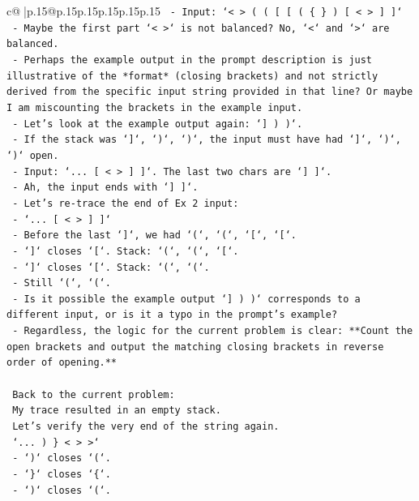 \documentclass{article}
\begin{document}
{\begin{supertabular}{c@{$\;$}|p{.15\linewidth}@{}p{.15\linewidth}p{.15\linewidth}p{.15\linewidth}p{.15\linewidth}p{.15\linewidth}}
{{{\texttt{   {-} Input: `< > ( ( {[} {[} ( \{ \} ) {[} < > {]} {]}`} \\
\texttt{   {-} Maybe the first part `< >` is not balanced? No, `<` and `>` are balanced.} \\
\texttt{   {-} Perhaps the example output in the prompt description is just illustrative of the *format* (closing brackets) and not strictly derived from the specific input string provided in that line? Or maybe I am miscounting the brackets in the example input.} \\
\texttt{   {-} Let's look at the example output again: `{]} ) )`.} \\
\texttt{   {-} If the stack was `{]}`, `)`, `)`, the input must have had `{]}`, `)`, `)` open.} \\
\texttt{   {-} Input: `... {[} < > {]} {]}`. The last two chars are `{]} {]}`.} \\
\texttt{   {-} Ah, the input ends with `{]} {]}`.} \\
\texttt{   {-} Let's re{-}trace the end of Ex 2 input:} \\
\texttt{     {-} `... {[} < > {]} {]}`} \\
\texttt{     {-} Before the last `{]}`, we had `(`, `(`, `{[}`, `{[}`.} \\
\texttt{     {-} `{]}` closes `{[}`. Stack: `(`, `(`, `{[}`.} \\
\texttt{     {-} `{]}` closes `{[}`. Stack: `(`, `(`.} \\
\texttt{     {-} Still `(`, `(`.} \\
\texttt{   {-} Is it possible the example output `{]} ) )` corresponds to a different input, or is it a typo in the prompt's example?} \\
\texttt{   {-} Regardless, the logic for the current problem is clear: **Count the open brackets and output the matching closing brackets in reverse order of opening.**} \\
\\ 
\texttt{   Back to the current problem:} \\
\texttt{   My trace resulted in an empty stack.} \\
\texttt{   Let's verify the very end of the string again.} \\
\texttt{   `... ) \} < > >`} \\
\texttt{   {-} `)` closes `(`.} \\
\texttt{   {-} `\}` closes `\{`.} \\
\texttt{   {-} `)` closes `(`.} \\
}}}
\end{supertabular}}
\end{document}
